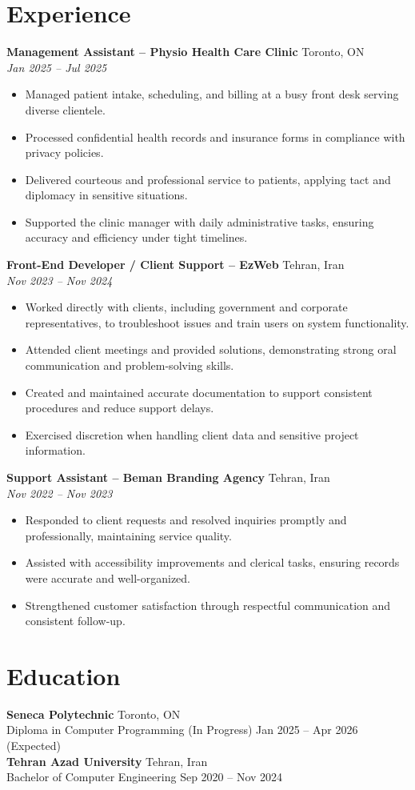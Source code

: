\documentclass[letterpaper,10pt]{article}
\begin{document}
\section*{Experience}
\textbf{Management Assistant – Physio Health Care Clinic} \hfill Toronto, ON \\
\textit{Jan 2025 – Jul 2025}
\begin{itemize}[leftmargin=*]
  \item Managed patient intake, scheduling, and billing at a busy front desk serving diverse clientele.
  \item Processed confidential health records and insurance forms in compliance with privacy policies.
  \item Delivered courteous and professional service to patients, applying tact and diplomacy in sensitive situations.
  \item Supported the clinic manager with daily administrative tasks, ensuring accuracy and efficiency under tight timelines.
\end{itemize}

\textbf{Front-End Developer / Client Support – EzWeb} \hfill Tehran, Iran \\
\textit{Nov 2023 – Nov 2024}
\begin{itemize}[leftmargin=*]
  \item Worked directly with clients, including government and corporate representatives, to troubleshoot issues and train users on system functionality.
  \item Attended client meetings and provided solutions, demonstrating strong oral communication and problem-solving skills.
  \item Created and maintained accurate documentation to support consistent procedures and reduce support delays.
  \item Exercised discretion when handling client data and sensitive project information.
\end{itemize}

\textbf{Support Assistant – Beman Branding Agency} \hfill Tehran, Iran \\
\textit{Nov 2022 – Nov 2023}
\begin{itemize}[leftmargin=*]
  \item Responded to client requests and resolved inquiries promptly and professionally, maintaining service quality.
  \item Assisted with accessibility improvements and clerical tasks, ensuring records were accurate and well-organized.
  \item Strengthened customer satisfaction through respectful communication and consistent follow-up.
\end{itemize}

\section*{Education}
\textbf{Seneca Polytechnic} \hfill Toronto, ON \\
Diploma in Computer Programming (In Progress) \hfill Jan 2025 -- Apr 2026 (Expected) \\

\textbf{Tehran Azad University} \hfill Tehran, Iran \\
Bachelor of Computer Engineering \hfill Sep 2020 -- Nov 2024 \\
\end{document}
